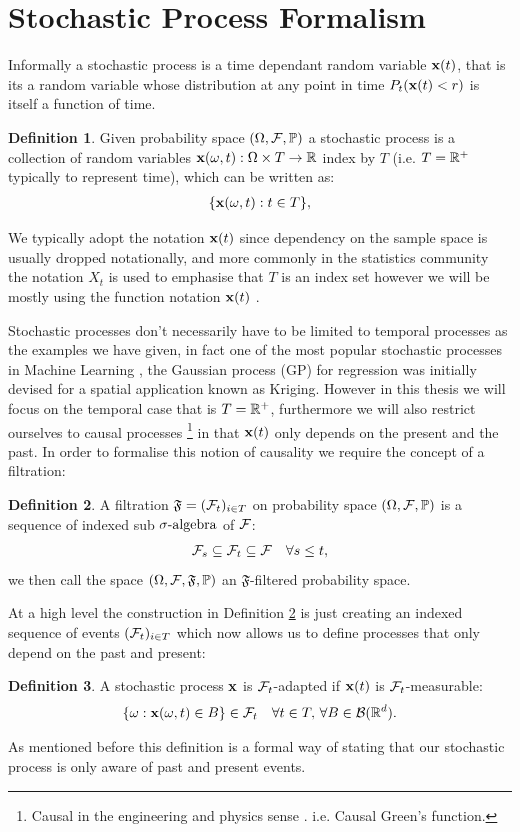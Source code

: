 \documentclass[a4paper,12pt,twoside,openright]{report}
\theoremstyle{definition}
\newtheorem{definition}{Definition}[section]
\begin{document}
\section{Stochastic Process Formalism}
Informally a stochastic process is a time dependant random variable ${\mathbf{x}}(t)$, that is its a random variable whose distribution at any point in time $P_t({\mathbf{x}}(t) < r)$  is itself a function of time.
\begin{definition}\label{def:stochproc}
Given probability space ${(\Omega, \mathcal{F}, \mathbb{P})}$ a stochastic process is a collection of random variables ${\mathbf{x}}(\omega, t) : \Omega \times T \rightarrow \mathbb{R}$ index by $T$ (i.e. $T={\mathbb{R}}^{+}$ typically to represent time), which can be written as:
\begin{align*}
    \{{\mathbf{x}}(\omega, t) : t \in T\},
\end{align*}
\end{definition}
We typically adopt the notation ${\mathbf{x}}(t)$ since dependency on the sample space is usually dropped notationally, and more commonly in the statistics community the notation $X_t$ is used to emphasise that $T$ is an index set however we will be mostly using the function notation ${\mathbf{x}}(t)$ . 

Stochastic processes don't necessarily have to be limited to temporal processes as the examples we have given, in fact one of the most popular stochastic processes in Machine Learning , the Gaussian process (GP) for regression was initially devised for a spatial application known as Kriging. However in this thesis we will focus on the temporal case that is $T={\mathbb{R}}^{+}$, furthermore we will also restrict ourselves to causal processes \footnote{Causal in the engineering and physics sense . i.e. Causal Green's function.} in that ${\mathbf{x}}(t)$ only depends on the present and the past. In order to formalise this notion of causality we require the concept of a filtration: 
\begin{definition}\label{def:filtration}
A filtration $\mathfrak{F} = ({\mathcal{F}}_{t})_{i\in T}$ on probability space ${(\Omega, \mathcal{F}, \mathbb{P})}$ is a sequence of indexed sub ${\sigma\text{-algebra}}$ of ${\mathcal{F}}$:
\begin{align*}
    {\mathcal{F}}_{s} \subseteq {\mathcal{F}}_{t} \subseteq {\mathcal{F}} \quad \forall  s \leq t,
\end{align*}
we then call the space ${(\Omega, \mathcal{F}, \mathfrak{F}, \mathbb{P})}$ an $\mathfrak{F}$-filtered probability space.
\end{definition}
At a high level the construction in Definition \ref{def:filtration} is just creating an indexed sequence of events $({\mathcal{F}}_{t})_{i\in T}$ which now allows us to define processes that only depend on the past and present:
\begin{definition}\label{def:adapted}
    A stochastic process ${\mathbf{x}}$ is ${\mathcal{F}}_t$-adapted  if ${\mathbf{x}}(t)$ is ${\mathcal{F}}_t$-measurable:
    \begin{align*}
        \{\omega :{\mathbf{x}}(\omega,t) \in B\} \in {\mathcal{F}}_t \quad \forall t \in T , \,\forall B \in {\mathcal{B}}({\mathbb{R}}^d).
    \end{align*}
\end{definition}
As mentioned before this definition is a formal way of stating that our stochastic process is only aware of past and present events.
\end{document}
